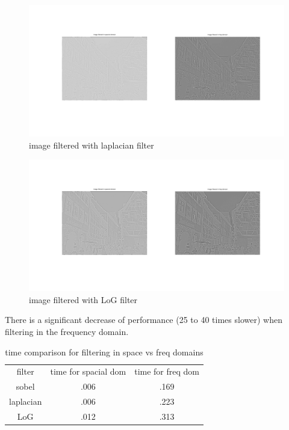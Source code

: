 \documentclass{article}
\begin{document}
	\begin{figure}[H]
		\includegraphics[width=\linewidth]{Q7/partC2.png}
		\caption{image filtered with laplacian filter}
	\end{figure}
	
	\begin{figure}[H]
		\includegraphics[width=\linewidth]{Q7/partC3.png}
		\caption{image filtered with LoG filter}
	\end{figure}
	
	There is a significant decrease of performance (25 to 40 times slower) when filtering in the frequency domain.
	\begin{table}[H]
		\centering
		\begin{tabular}{ c | c | c }
			filter & time for spacial dom & time for freq dom \\
			sobel & .006 & .169 \\
			laplacian & .006 & .223 \\
			LoG & .012 & .313 \\
		\end{tabular}
		\caption{time comparison for filtering in space vs freq domains}
	\end{table}
	
\end{document}
